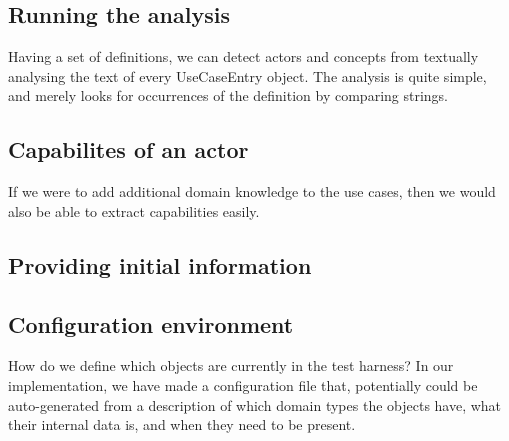 

\subsection{Running the analysis}
Having a set of definitions, we can detect actors and concepts from textually analysing the text of every UseCaseEntry object. The analysis is quite simple, and merely looks for occurrences of the definition by comparing strings.



\subsection{Capabilites of an actor}
If we were to add additional domain knowledge to the use cases, then we would also be able to extract capabilities easily.

\subsection{Providing initial information}

\subsection{Configuration environment}
How do we define which objects are currently in the test harness? In our implementation, we have made a configuration file that, potentially could be auto-generated from a description of which domain types the objects have, what their internal data is, and when they need to be present.


